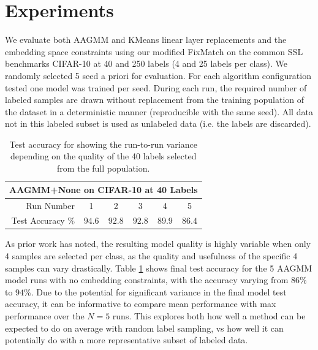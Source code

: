 \documentclass[10pt,twocolumn,letterpaper]{article}
\begin{document}
\section{Experiments}

We evaluate both AAGMM and KMeans linear layer replacements and the embedding space constraints using our modified FixMatch\cite{sohn2020fixmatch} on the common SSL benchmarks CIFAR-10 \cite{cifar10} at 40 and 250 labels (4 and 25 labels per class). 
We randomly selected 5 seed a priori for evaluation.
For each algorithm configuration tested one model was trained per seed.
During each run, the required number of labeled samples are drawn without replacement from the training population of the dataset in a deterministic manner (reproducible with the same seed).
All data not in this labeled subset is used as unlabeled data (i.e. the labels are discarded).


\begin{table}[h!]
	\begin{tabular}{r|c|c|c|c|c}
		\multicolumn{6}{c}{AAGMM+None on CIFAR-10 at 40 Labels}\\
		\hline
		Run Number & 1 & 2 & 3 & 4 & 5 \\
		\hline
		Test Accuracy \% & $94.6$ & $92.8$ & $92.8$ & $89.9$ & $86.4$ \\
	\end{tabular}
	\caption{Test accuracy for showing the run-to-run variance depending on the quality of the 40 labels selected from the full population.}
	\label{tab:runvariability}
\end{table}

As prior work \cite{sohn2020fixmatch} has noted, the resulting model quality is highly variable when only 4 samples are selected per class, as the quality and usefulness of the specific 4 samples can vary drastically. 
Table \ref{tab:runvariability} shows final test accuracy for the 5 AAGMM model runs with no embedding constraints, with the accuracy varying from $86\%$ to $94\%$.
Due to the potential for significant variance in the final model test accuracy, it can be informative to compare mean performance with max performance over the $N=5$ runs.
This explores both how well a method can be expected to do on average with random label sampling, vs how well it can potentially do with a more representative subset of labeled data.
\end{document}
